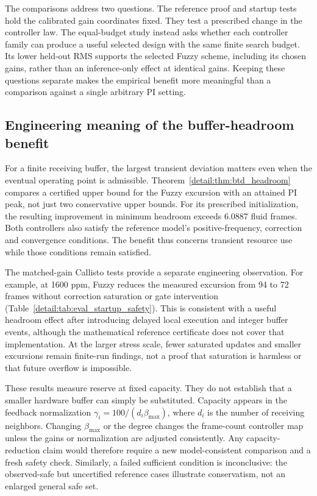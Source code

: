 The comparisons address two questions. The reference proof and
startup tests hold the calibrated gain coordinates fixed. They test
a prescribed change in the controller law. The
equal-budget study instead asks whether each controller family can
produce a useful selected design with the same finite search budget.
Its lower held-out RMS supports the selected Fuzzy scheme, including
its chosen gains, rather than an inference-only effect at identical
gains. Keeping these questions separate makes the empirical benefit
more meaningful than a comparison against a single arbitrary PI setting.

\subsection{Engineering meaning of the buffer-headroom benefit}
\label{detail:subsec:discussion_headroom}

For a finite receiving buffer, the largest transient deviation matters
even when the eventual operating point is admissible.
Theorem~\ref{detail:thm:btd_headroom} compares a certified upper bound for the
Fuzzy excursion with an attained PI peak, not just two conservative
upper bounds. For its prescribed initialization, the resulting
improvement in minimum headroom exceeds 6.0887 fluid frames. Both
controllers also satisfy the reference model's positive-frequency,
correction and convergence conditions. The benefit thus concerns
transient resource use while those conditions remain satisfied.

The matched-gain Callisto tests provide a separate engineering observation.
For example, at 1600 ppm, Fuzzy reduces the measured excursion from
94 to 72 frames without correction saturation or gate intervention
(Table~\ref{detail:tab:eval_startup_safety}). This is consistent with a useful
headroom effect after introducing delayed local execution and integer
buffer events, although the mathematical reference certificate does
not cover that implementation. At the larger stress scale, fewer
saturated updates and smaller excursions remain finite-run findings,
not a proof that saturation is harmless or that future overflow is
impossible.

These results measure reserve at fixed capacity. They do not establish
that a smaller hardware buffer can simply be substituted. Capacity
appears in the feedback normalization
$\gamma_i=100/(d_i\beta_{\max})$, where $d_i$ is the number of receiving neighbors.
Changing $\beta_{\max}$ or the degree changes the frame-count controller map
unless the gains or normalization are adjusted consistently. Any
capacity-reduction claim would therefore require a new model-consistent
comparison and a fresh safety check. Similarly, a failed sufficient
condition is inconclusive: the observed-safe but uncertified reference cases
illustrate conservatism, not an enlarged general safe set.

